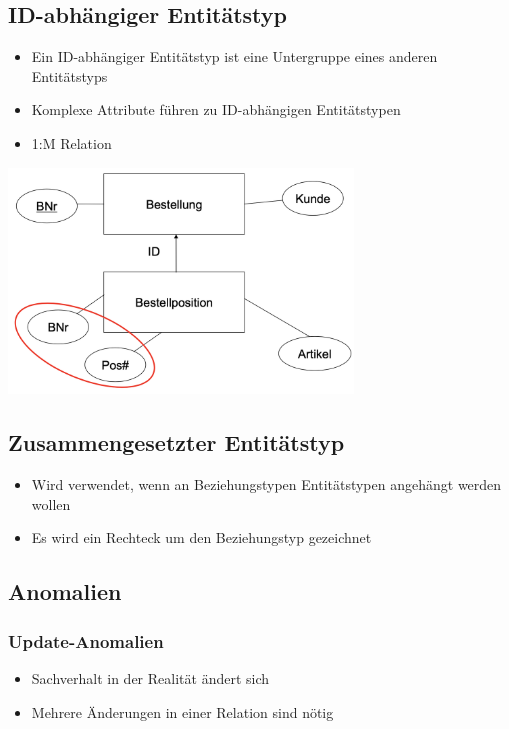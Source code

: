\documentclass[8pt,a4paper]{scrartcl}
\begin{document}
\begin{multicols*}{3}
			\subsection{ID-abhängiger Entitätstyp}
				\begin{itemize}\itemsep0pt			
					\item Ein ID-abhängiger Entitätstyp ist eine Untergruppe eines anderen Entitätstyps
					\item Komplexe Attribute führen zu ID-abhängigen Entitätstypen
					\item 1:M Relation
				\end{itemize}
				\includegraphics[height=6cm]{img/ID.png}
				
			\subsection{Zusammengesetzter Entitätstyp}
				\begin{itemize}\itemsep0pt		
					\item Wird verwendet, wenn an Beziehungstypen Entitätstypen angehängt werden wollen	
					\item Es wird ein Rechteck um den Beziehungstyp gezeichnet
				\end{itemize}
		
		
			\subsection{Anomalien}
				\subsubsection{Update-Anomalien}
					\begin{itemize}\itemsep0pt		
						\item Sachverhalt in der Realität ändert sich
						\item Mehrere Änderungen in einer Relation sind nötig
					\end{itemize}

\end{multicols*}
\end{document}
